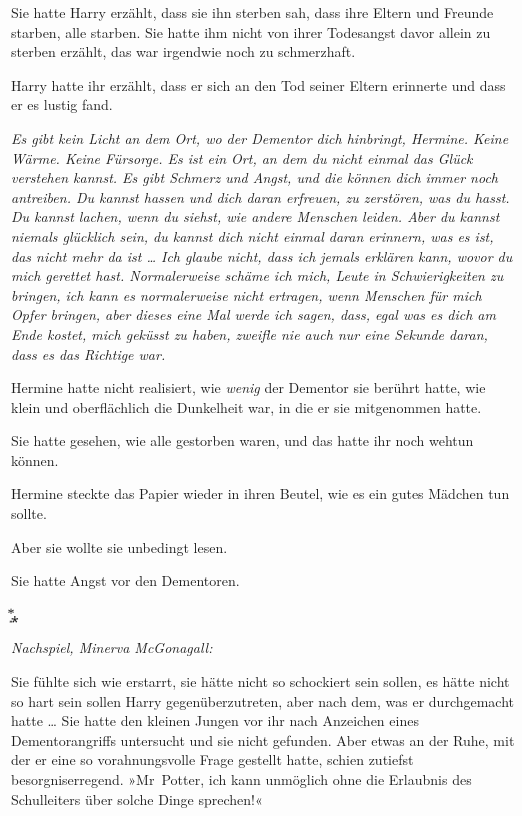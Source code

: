 {Sie hatte Harry erzählt, dass sie ihn sterben sah, dass ihre Eltern und Freunde starben, alle starben. Sie hatte ihm nicht von ihrer Todesangst davor allein zu sterben erzählt, das war irgendwie noch zu schmerzhaft.

Harry hatte ihr erzählt, dass er sich an den Tod seiner Eltern erinnerte und dass er es lustig fand.

\emph{Es gibt kein Licht an dem Ort, wo der Dementor dich hinbringt, Hermine. Keine Wärme. Keine Fürsorge. Es ist ein Ort, an dem du nicht einmal das Glück verstehen kannst. Es gibt Schmerz und Angst, und die können dich immer noch antreiben. Du kannst hassen und dich daran erfreuen, zu zerstören, was du hasst. Du kannst lachen, wenn du siehst, wie andere Menschen leiden. Aber du kannst niemals glücklich sein, du kannst dich nicht einmal daran erinnern, was es ist, das nicht mehr da ist … Ich glaube nicht, dass ich jemals erklären kann, wovor du mich gerettet hast. Normalerweise schäme ich mich, Leute in Schwierigkeiten zu bringen, ich kann es normalerweise nicht ertragen, wenn Menschen für mich Opfer bringen, aber dieses eine Mal werde ich sagen, dass, egal was es dich am Ende kostet, mich geküsst zu haben, zweifle nie auch nur eine Sekunde daran, dass es das Richtige war.}

Hermine hatte nicht realisiert, wie \emph{wenig} der Dementor sie berührt hatte, wie klein und oberflächlich die Dunkelheit war, in die er sie mitgenommen hatte.

Sie hatte gesehen, wie alle gestorben waren, und das hatte ihr noch wehtun können.

Hermine steckte das Papier wieder in ihren Beutel, wie es ein gutes Mädchen tun sollte.

Aber sie wollte sie unbedingt lesen.

Sie hatte Angst vor den Dementoren.

͙⃰⁎

\emph{Nachspiel, Minerva McGonagall:}

Sie fühlte sich wie erstarrt, sie hätte nicht so schockiert sein sollen, es hätte nicht so hart sein sollen Harry gegenüberzutreten, aber nach dem, was er durchgemacht hatte … Sie hatte den kleinen Jungen vor ihr nach Anzeichen eines Dementorangriffs untersucht und sie nicht gefunden. Aber etwas an der Ruhe, mit der er eine so vorahnungsvolle Frage gestellt hatte, schien zutiefst besorgniserregend. »Mr~Potter, ich kann unmöglich ohne die Erlaubnis des Schulleiters über solche Dinge sprechen!«

}
